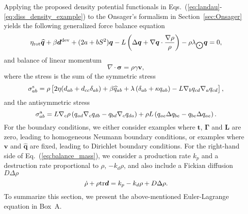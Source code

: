 Applying the proposed density potential functionals in Eqs.~(\ref{eq:landau}-\ref{eq:diss_density_example}) to the Onsager's formalism in Section~\ref{sec:Onsager} yields the following generalized force balance equation
\begin{align}  \label{first_govern}
	\eta_{\text{rot}} \widehat{\bm{q}} + \beta \bm{d}^{\rm dev} + (2a + b S^2)  \bm{q} - L \left(\Delta \bm{q} +   \nabla\bm{q} \cdot \frac{\nabla \rho}{\rho} \right) - \rho\lambda_{\bigodot} \bm{q} = 0,
\end{align}
and balance of linear momentum
\begin{equation}
	\label{eq:balance_forces_linear}
	\nabla\cdot\bm{\sigma} = \rho \gamma \bm{v},
\end{equation}
where the stress is the sum of the symmetric stress
\begin{equation}
	\sigma^{\rm s}_{ab} = \rho \left[2\eta  (d_{ab}+d_{cc} \delta_{ab}) + \beta  \widehat{q}_{ab}  + \lambda \left(\delta_{ab} + \kappa q_{ab}\right) -L\nabla_b q_{cd} \nabla_a q_{cd}\right],
\end{equation}
and the antisymmetric stress
\begin{equation}
	\sigma^{\rm a}_{ab} = L \nabla_c \rho \left( q_{ad} \nabla_c q_{db}  - q_{bd} \nabla_c q_{da}  \right) + \rho L  \left(q_{ae}\Delta q_{be}  -q_{be}  \Delta q_{ae}  \right).
\end{equation}
For the boundary conditions, we either consider examples where $\bm{t}$, $\bm{\Gamma}$ and $\bm{L}$ are zero, leading to homogeneous Neumann boundary conditions, or examples where $\bm{v}$ and $\widehat{\bm{q}}$ are fixed, leading to Dirichlet boundary conditions. For the right-hand side of Eq.~(\ref{eq:balance_mass}), we consider a production rate $k_p$ and a destruction rate proportional to $\rho$, $-k_d \rho$, and also include a Fickian diffusion $D\Delta \rho$
\begin{equation} \label{last_govern}
	\dot{\rho} + \rho {\rm tr} \bm{d} = k_p - k_d \rho + D \Delta \rho.
\end{equation}
To summarize this section, we present the above-mentioned Euler-Lagrange equation in Box~A.

